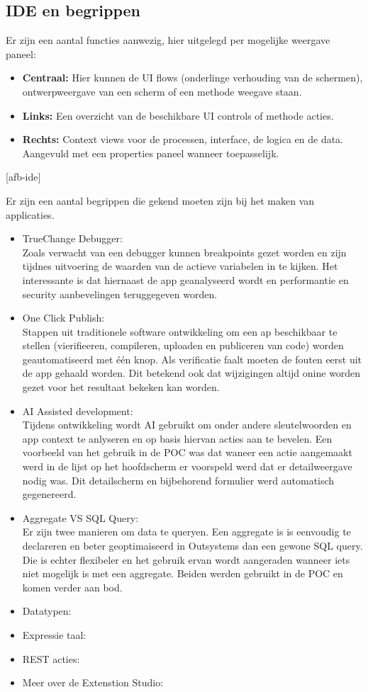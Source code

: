 \subsection{IDE en begrippen}
Er zijn een aantal functies aanwezig, hier uitgelegd per mogelijke weergave paneel:
\begin{itemize}
    \item \textbf{Centraal:} Hier kunnen de UI flows (onderlinge verhouding van de schermen), ontwerpweergave van een scherm of een methode weegave staan.
    \item \textbf{Links:} Een overzicht van de beschikbare UI controls of methode acties.
    \item \textbf{Rechts:} Context views voor de processen, interface, de logica en de data. Aangevuld met een properties paneel wanneer toepasselijk.
\end{itemize}

[afb-ide]

Er zijn een aantal begrippen die gekend moeten zijn bij het maken van applicaties.
\begin{itemize}
    \item TrueChange Debugger:\\
    Zoals verwacht van een debugger kunnen breakpoints gezet worden en zijn tijdnes uitvoering de waarden van de actieve variabelen in te kijken. Het interessante is dat hiernaast de app geanalyseerd wordt en performantie en security aanbevelingen teruggegeven worden.
    \item One Click Publish:\\
    Stappen uit traditionele software ontwikkeling om een ap beschikbaar te stellen (vierifieeren, compileren, uploaden en publiceren van code) worden geautomatiseerd met één knop. Als verificatie faalt moeten de fouten eerst uit de app gehaald worden.
    Dit betekend ook dat wijzigingen altijd onine worden gezet voor het resultaat bekeken kan worden.
    \item AI Assisted development:\\
    Tijdens ontwikkeling wordt AI gebruikt om onder andere sleutelwoorden en app context te anlyseren en op basis hiervan acties aan te bevelen. Een voorbeeld van het gebruik in de POC was dat waneer een actie aangemaakt werd in de lijst op het hoofdscherm er voorspeld werd dat er detailweergave nodig was. Dit detailscherm en bijbehorend formulier werd automatisch gegenereerd.
    \item Aggregate VS SQL Query:\\
    Er zijn twee manieren om data te queryen. Een aggregate is is eenvoudig te declareren en beter geoptimaiseerd in Outsystems dan een gewone SQL query. Die is echter flexibeler en het gebruik ervan wordt aangeraden wanneer iets niet mogelijk is met een aggregate. Beiden werden gebruikt in de POC en komen verder aan bod.
    \item Datatypen:
    \item Expressie taal:
    \item REST acties:
    \item Meer over de Extenstion Studio:
\end{itemize}

